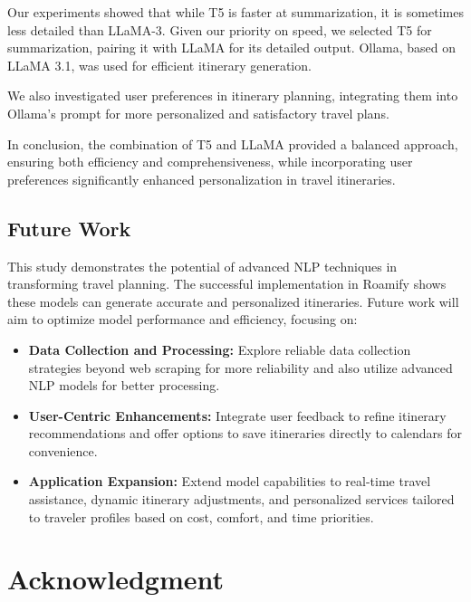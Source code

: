 \documentclass[final,3p,times,authoryear]{elsarticle}
\begin{document}
    Our experiments showed that while T5 is faster at summarization, it is sometimes less detailed than LLaMA-3. Given our priority on speed, we selected T5 for summarization, pairing it with LLaMA for its detailed output. Ollama, based on LLaMA 3.1, was used for efficient itinerary generation.
    
    We also investigated user preferences in itinerary planning, integrating them into Ollama's prompt for more personalized and satisfactory travel plans.
    
    In conclusion, the combination of T5 and LLaMA provided a balanced approach, ensuring both efficiency and comprehensiveness, while incorporating user preferences significantly enhanced personalization in travel itineraries.
    
    \vspace{-7pt}
    
    \subsection{Future Work}
        
        This study demonstrates the potential of advanced NLP techniques in transforming travel planning. The successful implementation in Roamify shows these models can generate accurate and personalized itineraries. Future work will aim to optimize model performance and efficiency, focusing on:
        \begin{itemize}
            \item \textbf{Data Collection and Processing:} Explore reliable data collection strategies beyond web scraping for more reliability and also utilize advanced NLP models for better processing.
            \item \textbf{User-Centric Enhancements:} Integrate user feedback to refine itinerary recommendations and offer options to save itineraries directly to calendars for convenience.
            \item \textbf{Application Expansion:} Extend model capabilities to real-time travel assistance, dynamic itinerary adjustments, and personalized services tailored to traveler profiles based on cost, comfort, and time priorities.
        \end{itemize}

\section*{Acknowledgment}
\end{document}
